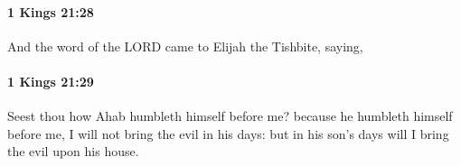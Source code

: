 		\paragraph{1 Kings 21:28} %
			\label{1KINGS-21-28}

			And the word of the LORD came to Elijah the Tishbite, saying,


		\paragraph{1 Kings 21:29} %
			\label{1KINGS-21-29}

			Seest thou how Ahab humbleth himself before me? because he humbleth himself before me, I will not bring the evil in his days: but in his son’s days will I bring the evil upon his house.

